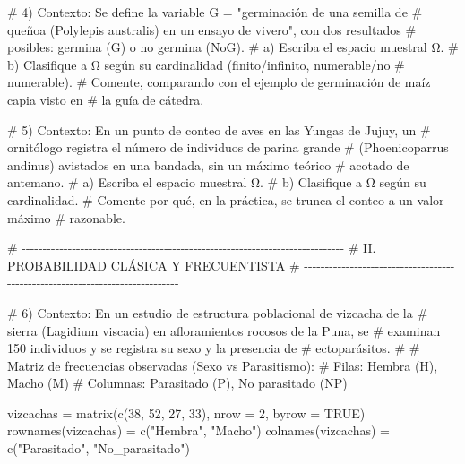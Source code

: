 \documentclass[
  spanish,
  letterpaper,
  DIV=11,
  numbers=noendperiod]{scrreprt}
\newenvironment{Shaded}{\begin{snugshade}}{\end{snugshade}}
\newcommand{\AttributeTok}[1]{\textcolor[rgb]{0.40,0.45,0.13}{#1}}
\newcommand{\CommentTok}[1]{\textcolor[rgb]{0.37,0.37,0.37}{#1}}
\newcommand{\ConstantTok}[1]{\textcolor[rgb]{0.56,0.35,0.01}{#1}}
\newcommand{\DecValTok}[1]{\textcolor[rgb]{0.68,0.00,0.00}{#1}}
\newcommand{\FunctionTok}[1]{\textcolor[rgb]{0.28,0.35,0.67}{#1}}
\newcommand{\NormalTok}[1]{\textcolor[rgb]{0.00,0.23,0.31}{#1}}
\newcommand{\OtherTok}[1]{\textcolor[rgb]{0.00,0.23,0.31}{#1}}
\newcommand{\StringTok}[1]{\textcolor[rgb]{0.13,0.47,0.30}{#1}}
\begin{document}
\begin{Shaded}
\begin{Highlighting}[]
\CommentTok{\# 4) Contexto: Se define la variable G = "germinación de una semilla de}
\CommentTok{\#    queñoa (Polylepis australis) en un ensayo de vivero", con dos resultados}
\CommentTok{\#    posibles: germina (G) o no germina (NoG).}
\CommentTok{\#    a) Escriba el espacio muestral Ω.}
\CommentTok{\#    b) Clasifique a Ω según su cardinalidad (finito/infinito, numerable/no}
\CommentTok{\#       numerable).}
\CommentTok{\#    Comente, comparando con el ejemplo de germinación de maíz capia visto en}
\CommentTok{\#    la guía de cátedra.}


\CommentTok{\# 5) Contexto: En un punto de conteo de aves en las Yungas de Jujuy, un}
\CommentTok{\#    ornitólogo registra el número de individuos de parina grande}
\CommentTok{\#    (Phoenicoparrus andinus) avistados en una bandada, sin un máximo teórico}
\CommentTok{\#    acotado de antemano.}
\CommentTok{\#    a) Escriba el espacio muestral Ω.}
\CommentTok{\#    b) Clasifique a Ω según su cardinalidad.}
\CommentTok{\#    Comente por qué, en la práctica, se trunca el conteo a un valor máximo}
\CommentTok{\#    razonable.}


\CommentTok{\# {-}{-}{-}{-}{-}{-}{-}{-}{-}{-}{-}{-}{-}{-}{-}{-}{-}{-}{-}{-}{-}{-}{-}{-}{-}{-}{-}{-}{-}{-}{-}{-}{-}{-}{-}{-}{-}{-}{-}{-}{-}{-}{-}{-}{-}{-}{-}{-}{-}{-}{-}{-}{-}{-}{-}{-}{-}{-}{-}{-}{-}{-}{-}{-}{-}{-}{-}{-}{-}{-}{-}{-}{-}{-}{-}{-}{-}}
\CommentTok{\# II. PROBABILIDAD CLÁSICA Y FRECUENTISTA}
\CommentTok{\# {-}{-}{-}{-}{-}{-}{-}{-}{-}{-}{-}{-}{-}{-}{-}{-}{-}{-}{-}{-}{-}{-}{-}{-}{-}{-}{-}{-}{-}{-}{-}{-}{-}{-}{-}{-}{-}{-}{-}{-}{-}{-}{-}{-}{-}{-}{-}{-}{-}{-}{-}{-}{-}{-}{-}{-}{-}{-}{-}{-}{-}{-}{-}{-}{-}{-}{-}{-}{-}{-}{-}{-}{-}{-}{-}{-}{-}}

\CommentTok{\# 6) Contexto: En un estudio de estructura poblacional de vizcacha de la}
\CommentTok{\#    sierra (Lagidium viscacia) en afloramientos rocosos de la Puna, se}
\CommentTok{\#    examinan 150 individuos y se registra su sexo y la presencia de}
\CommentTok{\#    ectoparásitos.}
\CommentTok{\#}
\CommentTok{\#    Matriz de frecuencias observadas (Sexo vs Parasitismo):}
\CommentTok{\#    Filas: Hembra (H), Macho (M)}
\CommentTok{\#    Columnas: Parasitado (P), No parasitado (NP)}

\NormalTok{vizcachas }\OtherTok{=} \FunctionTok{matrix}\NormalTok{(}\FunctionTok{c}\NormalTok{(}\DecValTok{38}\NormalTok{, }\DecValTok{52}\NormalTok{, }\DecValTok{27}\NormalTok{, }\DecValTok{33}\NormalTok{), }\AttributeTok{nrow =} \DecValTok{2}\NormalTok{, }\AttributeTok{byrow =} \ConstantTok{TRUE}\NormalTok{)}
\FunctionTok{rownames}\NormalTok{(vizcachas) }\OtherTok{=} \FunctionTok{c}\NormalTok{(}\StringTok{"Hembra"}\NormalTok{, }\StringTok{"Macho"}\NormalTok{)}
\FunctionTok{colnames}\NormalTok{(vizcachas) }\OtherTok{=} \FunctionTok{c}\NormalTok{(}\StringTok{"Parasitado"}\NormalTok{, }\StringTok{"No\_parasitado"}\NormalTok{)}


\end{Highlighting}
\end{Shaded}
\end{document}
